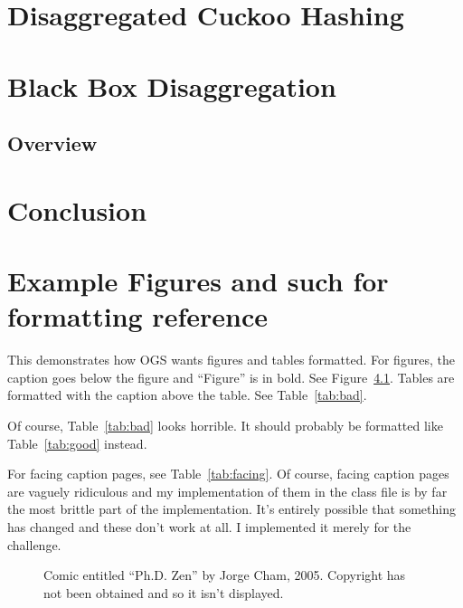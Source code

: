 \documentclass[12pt]{ucsddissertation}
\begin{document}
\chapter{Disaggregated Cuckoo Hashing}



%


%


\chapter{Black Box Disaggregation}

\section{Overview}

\chapter{Conclusion}

\chapter{ Example Figures and such for formatting reference}
This demonstrates how OGS wants figures and tables formatted. For
figures, the caption goes below the figure and ``Figure'' is in bold.
See Figure~\ref{fig:zen}. Tables are formatted with the caption above
the table. See Table~\ref{tab:bad}.

Of course, Table~\ref{tab:bad} looks horrible. It should probably be
formatted like Table~\ref{tab:good} instead.

For facing caption pages, see Table~\ref{tab:facing}. Of course,
facing caption pages are vaguely ridiculous and my implementation of
them in the class file is by far the most brittle part of the
implementation. It's entirely possible that something has changed and
these don't work at all. I implemented it merely for the challenge.

\begin{figure}
\centering
{}
\caption[``Ph.D. Zen'']{Comic entitled ``Ph.D. Zen'' by Jorge Cham, 2005. Copyright
has not been obtained and so it isn't displayed.}
\label{fig:zen}
\end{figure}
\end{document}

